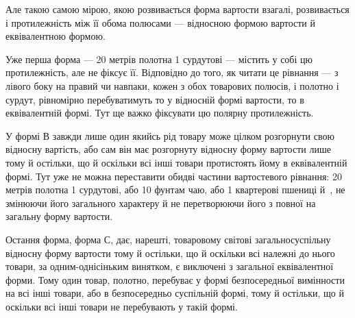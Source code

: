 Але такою самою мірою, якою розвивається форма вартости
взагалі, розвивається і протилежність між її обома полюсами —
відносною формою вартости й еквівалентною формою.

Уже перша форма — 20 метрів полотна \deq{} 1 сурдутові —
містить у собі цю протилежність, але не фіксує її. Відповідно до
того, як читати це рівнання — з лівого боку на правий чи навпаки,
кожен з обох товарових полюсів, і полотно і сурдут, рівномірно
перебуватимуть то у відносній формі вартости, то в еквівалентній
формі. Тут ще важко фіксувати цю полярну протилежність.

У формі $В$ завжди лише один якийсь рід товару може цілком
розгорнути свою відносну вартість, або сам він має розгорнуту
відносну форму вартости лише тому й остільки, що й оскільки
всі інші товари протистоять йому в еквівалентній формі. Тут уже
не можна переставити обидві частини вартостевого рівнання: 20 метрів
полотна \deq{} 1 сурдутові, або \deq{} 10 фунтам чаю, або \deq{} 1 квартерові
пшениці й~, не змінюючи його загального характеру
й не перетворюючи його з повної на загальну форму вартости.

Остання форма, форма $С$, дає, нарешті, товаровому світові
загальносуспільну відносну форму вартости тому й остільки,
що й оскільки всі належні до нього товари, за одним-однісіньким
винятком, є виключені з загальної еквівалентної форми. Тому
один товар, полотно, перебуває у формі безпосередньої вимінности
на всі інші товари, або в безпосередньо суспільній формі, тому
й остільки, що й оскільки всі інші товари не перебувають у такій
формі.

